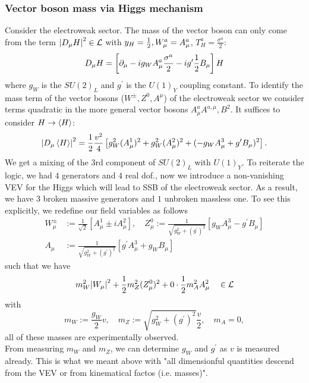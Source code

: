 \subsubsection{Vector boson mass via Higgs mechanism}
Consider the electroweak sector. The mass of the vector boson can only come from the term $\abs{D_\mu H}^2 \in \mathcal{L}$ with $y_H=\frac{1}{2}, W^a_\mu = A^a_\mu$, $T^a_H = \frac{\sigma^a}{2}$:
\begin{equation}
D_\mu H = \left[\partial_\mu - i g_W A^a_\mu \frac{\sigma^a}{2} - i g^\prime \frac{1}{2} B_\mu\right] H
\end{equation}
where $g_W$ is the $SU(2)_L$ and $g^\prime$ is the $U(1)_Y$ coupling constant. To identify the mass term of the vector bosons ($W^\pm, Z^0, A^\mu$) of the electroweak sector we consider terms quadratic in the more general vector bosons $A^a_\mu A^{a,\mu}, B^2$. It suffices to consider $H\rightarrow \expval{H}$:
\begin{equation}
\abs{D_\mu \expval{H}}^2 = \frac{1}{2} \frac{v^2}{4} \left[g^2_W (A^1_\mu)^2+ g^2_W (A^2_\mu)^2 + (-g_W A^3_\mu + g^\prime B_\mu)^2\right].
\end{equation}
We get a mixing of the $3$rd component of $SU(2)_L$ with $U(1)_Y$. To reiterate the logic, we had $4$ generators and $4$ real dof., now we introduce a non-vanishing VEV for the Higgs which will lead to SSB of the electroweak sector. As a result, we have $3$ broken massive generators and $1$ unbroken massless one. To see this explicitly, we redefine our field variables as follows
\begin{align}
	W^\pm_\mu &:= \frac{1}{\sqrt{2}} \left[A^1_\mu \pm i A^2_\mu\right], \quad Z^0_\mu := \frac{1}{\sqrt{g^2_W+(g^{\prime})^2}} \left[g_W A^3_\mu - g^\prime B_\mu\right]\\
	A_\mu &:= \frac{1}{\sqrt{g^2_W+(g^\prime)^2}} \left[g^\prime  A^3_\mu + g_W B_\mu\right] \nonumber 
\end{align}
such that we have
\begin{equation}
m^2_W \abs{W_\mu}^2+ \frac{1}{2} m^2_Z (Z^0_\mu)^2+ 0 \cdot \frac{1}{2} m^2_A A^2_\mu \quad \in \mathcal{L}
\end{equation}
with
\begin{equation}
m_W := \frac{g_W}{2} v,\quad m_Z := \sqrt{g^2_W+(g^\prime)^2} \frac{v}{2}, \quad m_A=0,
\end{equation}
all of these masses are experimentally observed.\\
From measuring $m_W$ and $m_Z$, we can determine $g_W$ and $g^\prime$ as $v$ is measured already. This is what we meant above with "all dimensionful quantities descend from the VEV or from kinematical factos (i.e. masses)".\\
